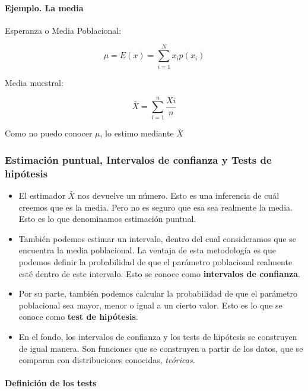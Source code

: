 \documentclass[]{book}
\let\oldparagraph\paragraph
\renewcommand{\paragraph}[1]{\oldparagraph{#1}\mbox{}}
\begin{document}
\hypertarget{ejemplo.-la-media}{%
\paragraph{Ejemplo. La media}\label{ejemplo.-la-media}}

Esperanza o Media Poblacional:

\[
\mu = E(x)= \sum_{i=1}^N x_ip(x_i)
\]

Media muestral:

\[
\bar{X}= \sum_{i=1}^n \frac{Xi}{n}
\]

Como no puedo conocer \(\mu\), lo estimo mediante \(\bar{X}\)

\hypertarget{estimacion-puntual-intervalos-de-confianza-y-tests-de-hipotesis}{%
\subsubsection{Estimación puntual, Intervalos de confianza y Tests de hipótesis}\label{estimacion-puntual-intervalos-de-confianza-y-tests-de-hipotesis}}

\begin{itemize}
\item
  El estimador \(\bar{X}\) nos devuelve un número. Esto es una inferencia de cuál creemos que es la media. Pero no es seguro que esa sea realmente la media. Esto es lo que denominamos estimación puntual.
\item
  También podemos estimar un intervalo, dentro del cual consideramos que se encuentra la media poblacional. La ventaja de esta metodología es que podemos definir la probabilidad de que el parámetro poblacional realmente esté dentro de este intervalo. Esto se conoce como \textbf{intervalos de confianza}.
\item
  Por su parte, también podemos calcular la probabilidad de que el parámetro poblacional sea mayor, menor o igual a un cierto valor. Esto es lo que se conoce como \textbf{test de hipótesis}.
\item
  En el fondo, los intervalos de confianza y los tests de hipótesis se construyen de igual manera. Son funciones que se construyen a partir de los datos, que se comparan con distribuciones conocidas, \emph{teóricas}.
\end{itemize}

\hypertarget{definicion-de-los-tests}{%
\paragraph{Definición de los tests}\label{definicion-de-los-tests}}
\end{document}
